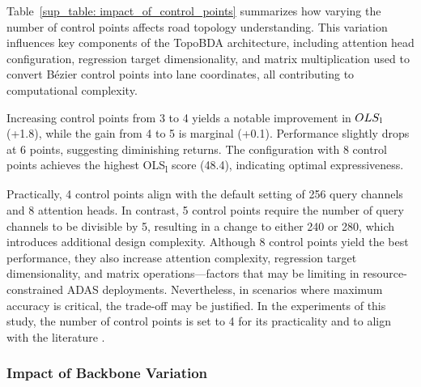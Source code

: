 Table~\ref{sup_table: impact_of_control_points} summarizes how varying the number of control points affects road topology understanding. This variation influences key components of the TopoBDA architecture, including attention head configuration, regression target dimensionality, and matrix multiplication used to convert Bézier control points into lane coordinates, all contributing to computational complexity.

Increasing control points from 3 to 4 yields a notable improvement in $OLS\textsubscript{l}$ (+1.8), while the gain from 4 to 5 is marginal (+0.1). Performance slightly drops at 6 points, suggesting diminishing returns. The configuration with 8 control points achieves the highest OLS\textsubscript{l} score (48.4), indicating optimal expressiveness.

Practically, 4 control points align with the default setting of 256 query channels and 8 attention heads. In contrast, 5 control points require the number of query channels to be divisible by 5, resulting in a change to either 240 or 280, which introduces additional design complexity. Although 8 control points yield the best performance, they also increase attention complexity, regression target dimensionality, and matrix operations—factors that may be limiting in resource-constrained ADAS deployments. Nevertheless, in scenarios where maximum accuracy is critical, the trade-off may be justified. In the experiments of this study, the number of control points is set to 4 for its practicality and to align with the literature \cite{wu2023topomlp}.

\subsubsection{Impact of Backbone Variation}
\label{sup_sec: impact_of_backbone_variations}

